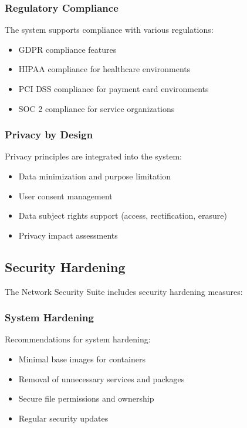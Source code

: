 \subsubsection{Regulatory Compliance}
The system supports compliance with various regulations:

\begin{itemize}
    \item GDPR compliance features
    \item HIPAA compliance for healthcare environments
    \item PCI DSS compliance for payment card environments
    \item SOC 2 compliance for service organizations
\end{itemize}

\subsubsection{Privacy by Design}
Privacy principles are integrated into the system:

\begin{itemize}
    \item Data minimization and purpose limitation
    \item User consent management
    \item Data subject rights support (access, rectification, erasure)
    \item Privacy impact assessments
\end{itemize}

\subsection{Security Hardening}
The Network Security Suite includes security hardening measures:

\subsubsection{System Hardening}
Recommendations for system hardening:

\begin{itemize}
    \item Minimal base images for containers
    \item Removal of unnecessary services and packages
    \item Secure file permissions and ownership
    \item Regular security updates
\end{itemize}

